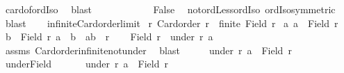 \begin{isabellebody}
\ card{\isacharunderscore}{\kern0pt}of{\isacharunderscore}{\kern0pt}ordIso\ \isamarkupfalse%
\ blast\isanewline
\ \ \ \ \isacommand{{\isacharbraceright}{\kern0pt}}\isamarkupfalse%
\isanewline
\ \ \ \ \isamarkupfalse%
\ \isamarkupfalse%
\ False\ \isamarkupfalse%
\ not{\isacharunderscore}{\kern0pt}ordLess{\isacharunderscore}{\kern0pt}ordIso\ ordIso{\isacharunderscore}{\kern0pt}symmetric\ \isamarkupfalse%
\ blast\isanewline
\ \ \isamarkupfalse%
\isanewline
{}\isamarkupfalse%
%
\endisatagproof
{\isafoldproof}%
%
\isadelimproof
\isanewline
%
\endisadelimproof
\isanewline
{}\isamarkupfalse%
\ infinite{\isacharunderscore}{\kern0pt}Card{\isacharunderscore}{\kern0pt}order{\isacharunderscore}{\kern0pt}limit{\isacharcolon}{\kern0pt}\isanewline
{}\ r{\isacharcolon}{\kern0pt}\ {\isachardoublequoteopen}Card{\isacharunderscore}{\kern0pt}order\ r{\isachardoublequoteclose}\ \ {\isachardoublequoteopen}{\isasymnot}finite\ {\isacharparenleft}{\kern0pt}Field\ r{\isacharparenright}{\kern0pt}{\isachardoublequoteclose}\isanewline
{}\ a{\isacharcolon}{\kern0pt}\ {\isachardoublequoteopen}a\ {\isasymin}\ Field\ r{\isachardoublequoteclose}\isanewline
{}\ {\isachardoublequoteopen}{\isasymexists}b\ {\isasymin}\ Field\ r{\isachardot}{\kern0pt}\ a\ {\isasymnoteq}\ b\ {\isasymand}\ {\isacharparenleft}{\kern0pt}a{\isacharcomma}{\kern0pt}b{\isacharparenright}{\kern0pt}\ {\isasymin}\ r{\isachardoublequoteclose}\isanewline
%
\isadelimproof
%
\endisadelimproof
%
\isatagproof
{}\isamarkupfalse%
{\isacharminus}{\kern0pt}\isanewline
\ \ \isamarkupfalse%
\ {\isachardoublequoteopen}Field\ r\ {\isasymnoteq}\ under\ r\ a{\isachardoublequoteclose}\isanewline
\ \ \isamarkupfalse%
\ assms\ Card{\isacharunderscore}{\kern0pt}order{\isacharunderscore}{\kern0pt}infinite{\isacharunderscore}{\kern0pt}not{\isacharunderscore}{\kern0pt}under\ \isamarkupfalse%
\ blast\isanewline
\ \ \isamarkupfalse%
\ \isamarkupfalse%
\ {\isachardoublequoteopen}under\ r\ a\ {\isasymle}\ Field\ r{\isachardoublequoteclose}\isanewline
\ \ \isamarkupfalse%
\ under{\isacharunderscore}{\kern0pt}Field\ \isacommand{{\isachardot}{\kern0pt}}\isamarkupfalse%
\isanewline
\ \ \isamarkupfalse%
\ \isamarkupfalse%
\ {\isachardoublequoteopen}under\ r\ a\ {\isacharless}{\kern0pt}\ Field\ r{\isachardoublequoteclose}\ \isamarkupfalse%

\end{isabellebody}
